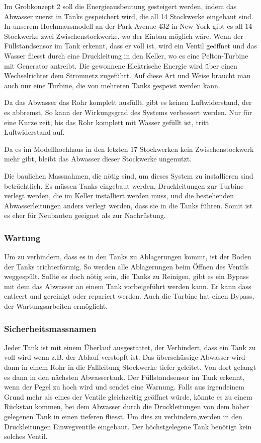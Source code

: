 Im Grobkonzept 2 soll die Energieausbeutung gesteigert werden, indem das Abwasser zuerst in Tanks gespeichert wird, die all 14 Stockwerke eingebaut sind. In unserem Hochmausmodell an der Park Avenue 432 in New York gibt es all 14 Stockwerke zwei Zwischenstockwerke, wo der Einbau möglich wäre. Wenn der Füllstandsensor im Tank erkennt, dass er voll ist, wird ein Ventil geöffnet und das Wasser fliesst durch eine Druckleitung in den Keller, wo es eine Pelton-Turbine mit Generator antreibt. Die gewonnene Elektrische Energie wird über einen Wechselrichter dem Stromnetz zugeführt. Auf diese Art und Weise braucht man auch nur eine Turbine, die von mehreren Tanks gespeist werden kann. 

Da das Abwasser das Rohr komplett ausfüllt, gibt es keinen Luftwiderstand, der es abbremst. So kann der Wirkungsgrad des Systems verbessert werden. Nur für eine Kurze zeit, bis das Rohr komplett mit Wasser gefüllt ist, tritt Luftwiderstand auf.  

Da es im Modellhochhaus in den letzten 17 Stockwerken kein Zwischenstockwerk mehr gibt, bleibt das Abwasser dieser Stockwerke ungenutzt. 

Die baulichen Massnahmen, die nötig sind, um dieses System zu installieren sind beträchtlich. Es müssen Tanks eingebaut werden, Druckleitungen zur Turbine verlegt werden, die im Keller installiert werden muss, und die bestehenden Abwasserleitungen anders verlegt werden, dass sie in die Tanks führen. Somit ist es eher für Neubauten geeignet als zur Nachrüstung.

\subsubsection{Wartung}
Um zu verhindern, dass es in den Tanks zu Ablagerungen kommt, ist der Boden der Tanks trichterförmig. So werden alle Ablagerungen beim Öffnen des Ventils weggespült. Sollte es doch nötig sein, die Tanks zu Reinigen, gibt es ein Bypass mit dem das Abwasser an einem Tank vorbeigeführt werden kann. Er kann dass entleert und gereinigt oder repariert werden. Auch die Turbine hat einen Bypass, der Wartungsarbeiten ermöglicht.


\subsubsection{Sicherheitsmassnamen}
Jeder Tank ist mit einem Überlauf ausgestattet, der Verhindert, dass ein Tank zu voll wird wenn z.B. der Ablauf verstopft ist. Das überschüssige Abwasser wird dann in einem Rohr in die Fallleitung Stockwerke tiefer geleitet. Von dort gelangt es dann in den nächsten Abwassertank. Der Füllstandsensor im Tank erkennt, wenn der Pegel zu hoch wird und sendet eine Warnung.
Falls aus irgendeinem Grund mehr als eines der Ventile gleichzeitig geöffnet würde, könnte es zu einem Rückstau kommen, bei dem Abwasser durch die Druckleitungen von dem höher gelegenen Tank in einen tieferen fliesst. Um dies zu verhindern,werden in den Druckleitungen Einwegventile eingebaut. Der höchstgelegene Tank benötigt kein solches Ventil. 


